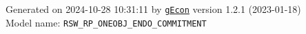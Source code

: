 \documentclass[10pt,a4paper]{article}
\numberwithin{equation}{section}
\begin{document}
\begin{landscape}
\begin{flushleft}{\large
Generated  on 2024-10-28 10:31:11 by \href{http://gecon.r-forge.r-project.org/}{\texttt{gEcon}} version 1.2.1 (2023-01-18)\\
Model name: \verb+RSW_RP_ONEOBJ_ENDO_COMMITMENT+
}\end{flushleft}


\end{landscape}

\end{document}
